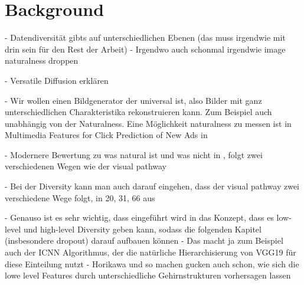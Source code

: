 \chapter{Background}


- Datendiversität gibts auf unterschiedlichen Ebenen (das muss irgendwie mit drin sein für den Rest der Arbeit)
- Irgendwo auch schonmal irgendwie image naturalness droppen



- Versatile Diffusion \cite{xuVersatileDiffusionText2024} erklären

- Wir wollen einen Bildgenerator der universal ist, also Bilder mit ganz unterschiedlichen Charakteristika rekonstruieren kann. Zum Beispiel auch unabhängig von der Naturalness. Eine Möglichkeit naturalness zu messen ist in Multimedia Features for Click Prediction of New Ads in

- Modernere Bewertung zu was natural ist und was nicht in \cite{chenExploringNaturalnessAIGenerated2023}, folgt zwei verschiedenen Wegen wie der visual pathway

- Bei der Diversity kann man auch darauf eingehen, dass der visual pathway zwei verschiedene Wege folgt, in 20, 31, 66 aus \cite{chenExploringNaturalnessAIGenerated2023}

    - Genauso ist es sehr wichtig, dass eingeführt wird in das Konzept, dass es low-level und high-level Diversity geben kann, sodass die folgenden Kapitel (insbesondere dropout) darauf aufbauen können
    - Das macht ja zum Beispiel auch der ICNN Algorithmus, der die natürliche Hierarchisierung von VGG19 für diese Einteilung nutzt
    - Horikawa und so machen gucken auch schon, wie sich die lowe level Features durch unterschiedliche Gehirnstrukturen vorhersagen lassen
